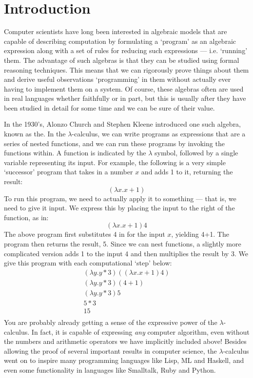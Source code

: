 \chapter{Introduction}\label{Introduction}
	Computer scientists have long been interested in algebraic models that are capable of describing computation by formulating a `program' as an algebraic expression along with a set of rules for reducing such expressions ---  i.e. `running' them.  
The advantage of such algebras is that they can be studied using formal reasoning techniques.  
This means that we can rigorously prove things about them and derive useful observations `programming' in them without actually ever having to implement them on a system.  
Of course, these algebras often are used in real languages whether faithfully or in part, but this is usually after they have been studied in detail for some time and we can be sure of their value.
	
	In the 1930's, Alonzo Church and Stephen Kleene introduced one such algebra, known as the.  
In the $\lambda$-calculus, we can write programs as expressions that are a series of nested functions, and we can run these programs by invoking the functions within.  
A function is indicated by the $\lambda$ symbol, followed by a single variable representing its input.  
For example, the following is a very simple `successor' program that takes in a number $x$ and adds 1 to it, returning the result:
	\[
		(\lambda x. x + 1)
	\]
To run this program, we need to actually apply it to something ---  that is, we need to give it input.  
We express this by placing the input to the right of the function, as in:
\[
	(\lambda x. x + 1) 4
\]
The above program first substitutes 4 in for the input $x$, yielding 4+1.  
The program then returns the result, 5.  
Since we can nest functions, a slightly more complicated version adds 1 to the input 4 and then multiplies the result by 3.  
We give this program with each computational `step' below:
\begin{align*}
	(\lambda y. y * 3) ((\lambda x. x + 1) 4)\\
	(\lambda y. y * 3) (4+1)\\
	(\lambda y. y * 3) 5\\
	5 * 3\\
	15\\
\end{align*}
You are probably already getting a sense of the expressive power of the $\lambda$-calculus.  
In fact, it is capable of expressing \emph{any} computer algorithm, even without the numbers and arithmetic operators we have implicitly included above!  Besides allowing the proof of several important results in computer science, the $\lambda$-calculus went on to inspire many programming languages like Lisp, ML and Haskell, and even some functionality in languages like Smalltalk, Ruby and Python.
